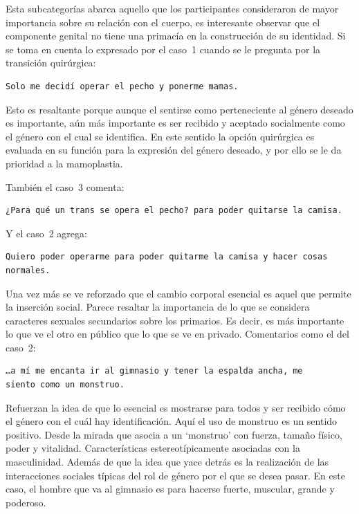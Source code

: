 Esta subcategorías abarca aquello que los participantes consideraron de mayor
importancia sobre su relación con el cuerpo, es interesante observar que el
componente genital no tiene una primacía en la construcción de su identidad. Si
se toma en cuenta lo expresado por el caso~1 cuando se le pregunta por la
transición quirúrgica:

\begin{verbatim}
Solo me decidí operar el pecho y ponerme mamas.
\end{verbatim}

Esto es resaltante porque aunque el sentirse como perteneciente al género
deseado es importante, aún más importante es ser recibido y aceptado socialmente
como el género con el cual se identifica. En este sentido la opción quirúrgica
es evaluada en su función para la expresión del género deseado, y por ello se le
da prioridad a la mamoplastia.

También el caso~3 comenta:

\begin{verbatim}
¿Para qué un trans se opera el pecho? para poder quitarse la camisa.
\end{verbatim}

Y el caso~2 agrega:

\begin{verbatim}
Quiero poder operarme para poder quitarme la camisa y hacer cosas normales.
\end{verbatim}

Una vez más se ve reforzado que el cambio corporal esencial es aquel que permite
la inserción social. Parece resaltar la importancia de lo que se considera
caracteres sexuales secundarios sobre los primarios. Es decir, es más importante
lo que ve el otro en público que lo que se ve en privado. Comentarios como el
del caso~2:

\begin{verbatim}
…a mí me encanta ir al gimnasio y tener la espalda ancha, me
siento como un monstruo.
\end{verbatim}

Refuerzan la idea de que lo esencial es mostrarse para todos y ser recibido cómo
el género con el cuál hay identificación. Aquí el uso de monstruo es un sentido
positivo. Desde la mirada que asocia a un ‘monstruo’ con fuerza, tamaño físico,
poder y vitalidad. Características estereotípicamente asociadas con la
masculinidad. Además de que la idea que yace detrás es la realización de las
interacciones sociales típicas del rol de género por el que se desea pasar. En
este caso, el hombre que va al gimnasio es para hacerse fuerte, muscular, grande
y poderoso.

